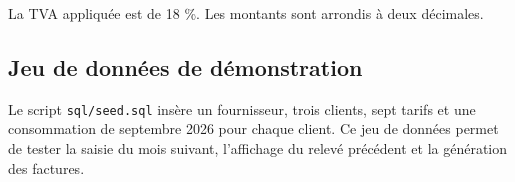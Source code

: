 La TVA appliquée est de 18 \%. Les montants sont arrondis à deux décimales.

\subsection{Jeu de données de démonstration}

Le script \texttt{sql/seed.sql} insère un fournisseur, trois clients, sept tarifs et une consommation de septembre 2026 pour chaque client. Ce jeu de données permet de tester la saisie du mois suivant, l'affichage du relevé précédent et la génération des factures.
